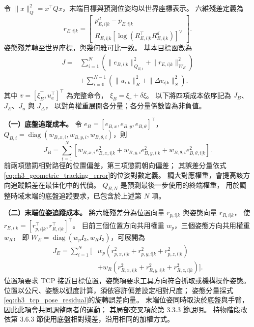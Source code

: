 令 $\|x\|_Q^2=x^\top Qx$，末端目標與預測位姿均以世界座標表示。
六維殘差定義為
\begin{equation}
    r_{E,i|k}=
    \begin{bmatrix}
        p_{E,i|k}^{d}-p_{E,i|k}\\
        R_{E,i|k}
        [\log(R_{E,i|k}^{\top}R_{E,i|k}^{d})]^\vee
    \end{bmatrix}.
    \label{eq:ch3_tcp_pose_residual}
\end{equation}
姿態殘差轉至世界座標，與幾何雅可比一致。
基本目標函數為
\begin{equation}
    \begin{aligned}
        J={}&\sum_{i=1}^{N}
        \left(\|e_{B,i|k}\|_{Q_{B,i}}^2+
              \|r_{E,i|k}\|_{W_E}^2\right)\\
        &+\sum_{i=0}^{N-1}
        \left(\|u_{i|k}\|_R^2+
              \|\Delta v_{i|k}\|_S^2\right).
    \end{aligned}
    \label{eq:ch3_wholebody_objective}
\end{equation}
其中 $v=[\xi_B^\top,u_a^\top]^\top$ 為完整命令，
$\xi_B=\xi_r+\delta\xi$。
以下將四項成本依序記為 $J_B$、$J_E$、$J_u$ 與 $J_\Delta$，
以對角權重展開各分量；各分量係數皆為非負值。

\noindent\textbf{（一）底盤追蹤成本。}
令 $e_B=[e_{B,x},e_{B,y},e_{B,\theta}]^\top$，
$Q_{B,i}=\operatorname{diag}(w_{B,x,i},w_{B,y,i},w_{B,\theta,i})$，則
\begin{equation}
    J_B=\sum_{i=1}^{N}\left[
        w_{B,x,i}e_{B,x,i|k}^{2}
        +w_{B,y,i}e_{B,y,i|k}^{2}
        +w_{B,\theta,i}e_{B,\theta,i|k}^{2}\right].
    \label{eq:ch3_base_tracking_cost_expanded}
\end{equation}
前兩項懲罰相對路徑的位置偏差，第三項懲罰朝向偏差；
其誤差分量依式\eqref{eq:ch3_geometric_tracking_error}的位姿對數定義。
調大對應權重，會提高該方向追蹤誤差在最佳化中的代價。
$Q_{B,N}$ 是預測最後一步使用的終端權重，
用於調整時域末端的底盤追蹤要求，已包含於上述第 $N$ 項。

\noindent\textbf{（二）末端位姿追蹤成本。}
將六維殘差分為位置向量 $r_{p,i|k}$ 與姿態向量 $r_{R,i|k}$，
使 $r_{E,i|k}=[r_{p,i|k}^\top,r_{R,i|k}^\top]^\top$。
目前三個位置方向共用權重 $w_p$，三個姿態方向共用權重 $w_R$，
即 $W_E=\operatorname{diag}(w_p I_3,w_R I_3)$，可展開為
\begin{equation}
    \begin{aligned}
        J_E=\sum_{i=1}^{N}\big[&
        w_p(r_{p,x,i|k}^{2}+r_{p,y,i|k}^{2}+r_{p,z,i|k}^{2})\\
        &+w_R(r_{R,x,i|k}^{2}+r_{R,y,i|k}^{2}+r_{R,z,i|k}^{2})\big].
    \end{aligned}
    \label{eq:ch3_tcp_tracking_cost_expanded}
\end{equation}
位置項要求 TCP 接近目標位置，姿態項要求工具方向符合抓取或機構操作姿態。
位置以公尺、姿態以弧度計算，須依容許偏差設定相對尺度；
姿態分量採式\eqref{eq:ch3_tcp_pose_residual}的旋轉誤差向量。
末端位姿同時取決於底盤與手臂，因此此項會共同調整兩者的運動；
其局部交叉項於第 3.3.3 節說明。
持物階段改依第 3.6.3 節使用底盤相對殘差，沿用相同的加權方式。

